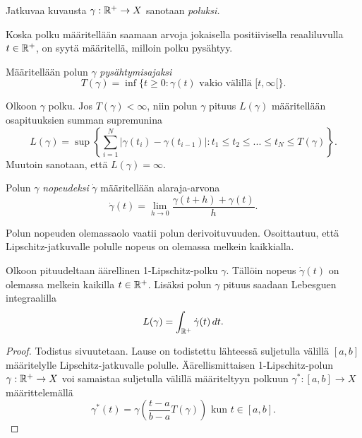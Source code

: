 \documentclass[12pt,oneside,a4paper]{amsbook} %
\begin{document}
\begin{definition}
    Jatkuvaa kuvausta $\gamma:{\mathbb{R}^{+}} \to X$ sanotaan \textit{poluksi.}
\end{definition}

Koska polku määritellään saamaan arvoja jokaisella positiivisella reaaliluvulla $t \in {\mathbb{R}^{+}}$, on syytä määritellä, milloin polku pysähtyy.

\begin{definition}
    Määritellään polun $\gamma$ \textit{pysähtymisajaksi} 
    \begin{equation*}
        T(\gamma) = \inf\{t\ge0:\gamma(t) \text{ vakio välillä } [t,\infty[ \}.
    \end{equation*}
\end{definition}



\begin{definition}
    Olkoon $\gamma$ polku. Jos $T(\gamma) < \infty$, niin polun $\gamma$ pituus $L(\gamma)$ määritellään osapituuksien summan supremunina
    \begin{equation*}
        L(\gamma) = \sup\left\{\sum_{i=1}^N|\gamma(t_i) - \gamma(t_{i-1})| : t_1 \le t_2 \le ... \le t_N \le T(\gamma)\right\}.
    \end{equation*}
    Muutoin sanotaan, että $L(\gamma) = \infty$.
\end{definition}

\begin{definition}
    Polun $\gamma$ \textit{nopeudeksi} $\dot \gamma$ määritellään alaraja-arvona
    \begin{equation*}
        \dot\gamma(t) = \lim_{h\to 0} \frac{\gamma(t+h) + \gamma(t)}{h}.
    \end{equation*}
\end{definition}

Polun nopeuden olemassaolo vaatii polun derivoituvuuden. Osoittautuu, että Lipschitz-jatkuvalle polulle nopeus on olemassa melkein kaikkialla.

\begin{theorem}
    Olkoon pituudeltaan äärellinen 1-Lipschitz-polku $\gamma$. Tällöin nopeus $\dot \gamma(t)$ on olemassa melkein kaikilla $t \in {\mathbb{R}^{+}}$. Lisäksi polun $\gamma$ pituus saadaan Lebesguen integraalilla
    \begin{equation*}
        L(\gamma) = \int_{\mathbb{R}^{+}} \dot \gamma(t) \, dt.
    \end{equation*}
\end{theorem}
\begin{proof}
    Todistus sivuutetaan. Lause on todistettu lähteessä \cite[s.57] {burago} suljetulla välillä $[a, b]$ määritelylle Lipschitz-jatkuvalle polulle. Äärellismittaisen 1-Lipschitz-polun $\gamma:{\mathbb{R}^{+}} \to X$ voi samaistaa suljetulla välillä määriteltyyn polkuun $\gamma^*:[a,b] \to X$ määrittelemällä 
    \begin{equation*}
        \gamma^*(t) =  \gamma\left(\frac{t-a}{b-a}T(\gamma)\right) \text{ kun } t \in [a, b].
    \end{equation*}
\end{proof}
\end{document}
